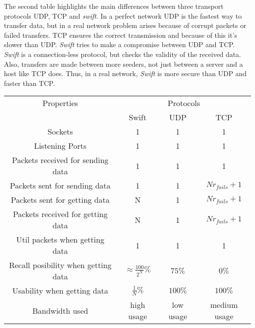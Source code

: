 
The second table highlights the main differences between three transport protocols UDP, TCP and \emph{swift}. In
a perfect network UDP is the fastest way to transfer data, but in a real network problem arises because of corrupt
packets or failed transfers. TCP ensures the correct transmission and because of this it's slower than UDP. \emph{Swift}
tries to make a compromise between UDP and TCP. \emph{Swift} is a connection-less protocol, but checks the validity of
the received data. Also, transfers are made between more seeders, not just between a server and a host like TCP does.
Thus, in a real network, \emph{Swift} is more secure than UDP and faster than TCP.


\begin{center}
    \begin{tabular}{|c|c|c|c|}
        \toprule
        Properties & \multicolumn{3}{|c|}{Protocols} \\
        \cmidrule(r){2-4}
         & Swift & UDP & TCP \\
        \midrule
        Sockets  & 1 & 1 & 1 \\
        \midrule
        Listening Ports  & 1 & 1 & 1 \\
        \midrule
        Packets received for sending data  & 1 & 1 & 1 \\
        \midrule
        Packets sent for sending data  & 1 & 1 & $Nr_{fails} + 1$ \\
        \midrule
        Packets sent for getting data  & N & 1 & $Nr_{fails} + 1$ \\
        \midrule
        Packets received for getting data  & N & 1 & $Nr_{fails} + 1$ \\        
        \midrule
        Util packets when getting data  & 1 & 1 & 1 \\
        \midrule
        Recall posibility when getting data & $\approx\frac{100}{2^{N}}\%$ & $75\%$ & $0\%$ \\
        \midrule
        Usability when getting data & $\frac{1}{N}\%$ & $100\%$ & $100\%$ \\
        \midrule
        Bandwidth used   & high usage & low usage & medium usage \\
        \bottomrule
    \end{tabular}
\end{center}    

